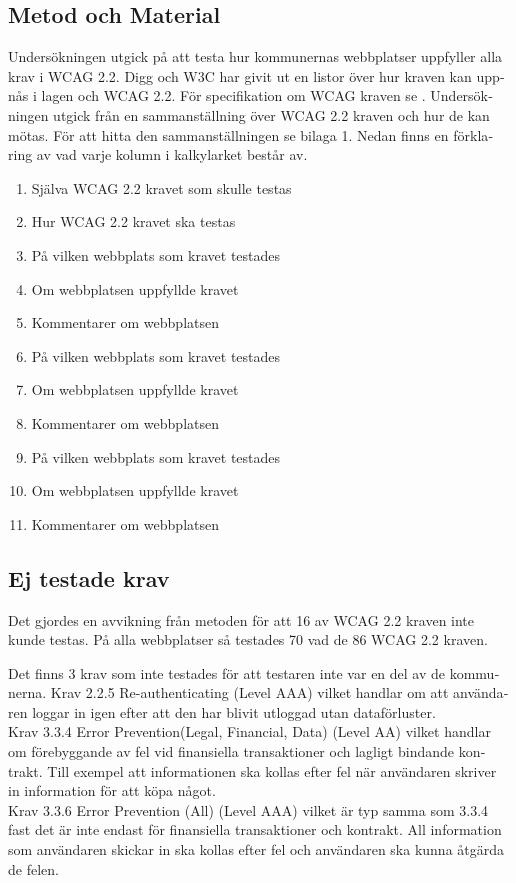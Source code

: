 \documentclass[11p]{article}
\begin{document}
\begin{otherlanguage}{swedish}
    \section{Metod och Material}

    Undersökningen utgick på att testa hur kommunernas webbplatser uppfyller alla krav i WCAG 2.2.
    Digg och W3C har givit ut en listor över hur kraven kan uppnås i lagen och WCAG 2.2.
    För specifikation om WCAG kraven se \textcite{WCAG_2.2}.
    Undersökningen utgick från en sammanställning över WCAG 2.2 kraven och hur de kan mötas.
    För att hitta den sammanställningen se bilaga 1.
    Nedan finns en förklaring av vad varje kolumn i kalkylarket består av.
    \begin{enumerate}
        \item Själva WCAG 2.2 kravet som skulle testas
        \item Hur WCAG 2.2 kravet ska testas
        \item På vilken webbplats som kravet testades
        \item Om webbplatsen uppfyllde kravet
        \item Kommentarer om webbplatsen
        \item På vilken webbplats som kravet testades
        \item Om webbplatsen uppfyllde kravet
        \item Kommentarer om webbplatsen
        \item På vilken webbplats som kravet testades
        \item Om webbplatsen uppfyllde kravet
        \item Kommentarer om webbplatsen
    \end{enumerate}

    \subsection{Ej testade krav}

    Det gjordes en avvikning från metoden för att 16 av WCAG 2.2 kraven inte kunde testas.
    På alla webbplatser så testades 70 vad de 86 WCAG 2.2 kraven.

    Det finns 3 krav som inte testades för att testaren inte var en del av de kommunerna.
    Krav 2.2.5 Re-authenticating (Level AAA) vilket handlar om att användaren loggar in igen efter att den har blivit utloggad utan dataförluster.
    \\ Krav 3.3.4 Error Prevention(Legal, Financial, Data) (Level AA) vilket handlar om förebyggande av fel vid finansiella transaktioner och lagligt bindande kontrakt.
    Till exempel att informationen ska kollas efter fel när användaren skriver in information för att köpa något.
    \\  Krav 3.3.6 Error Prevention (All) (Level AAA) vilket är typ samma som 3.3.4 fast det är inte endast för finansiella transaktioner och kontrakt.
    All information som användaren skickar in ska kollas efter fel och användaren ska kunna åtgärda de felen.


\end{otherlanguage}
\end{document}
